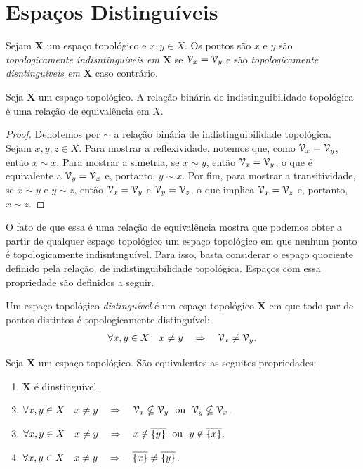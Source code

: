 \section{Espaços Distinguíveis}

\begin{defi}
	Sejam $\bm X$ um espaço topológico e $x,y \in X$. Os pontos são $x$ e $y$ são \emph{topologicamente indisntinguíveis em $\bm X$} se $\mathcal{V}_x = \mathcal{V}_y$ e são \emph{topologicamente disntinguíveis em $\bm X$} caso contrário.
\end{defi}

\begin{prop}
	Seja $\bm X$ um espaço topológico. A relação binária de indistinguibilidade topológica é uma relação de equivalência em $X$.
\end{prop}
\begin{proof}
	Denotemos por $\sim$ a relação binária de indistinguibilidade topológica. Sejam $x,y,z \in X$. Para mostrar a reflexividade, notemos que, como $\mathcal{V}_x=\mathcal{V}_y$, então $x \sim x$. Para mostrar a simetria, se $x \sim y$, então $\mathcal{V}_x=\mathcal{V}_y$, o que é equivalente a $\mathcal{V}_y=\mathcal{V}_x$ e, portanto, $y \sim x$. Por fim, para mostrar a transitividade, se $x \sim y$ e $y \sim z$, então $\mathcal{V}_x=\mathcal{V}_y$ e $\mathcal{V}_y=\mathcal{V}_z$, o que implica $\mathcal{V}_x=\mathcal{V}_z$ e, portanto, $x \sim z$.
\end{proof}

O fato de que essa é uma relação de equivalência mostra que podemos obter a partir de qualquer espaço topológico um espaço topológico em que nenhum ponto é topologicamente indisntinguível. Para isso, basta considerar o espaço quociente definido pela relação. de indistinguibilidade topológica. Espaços com essa propriedade são definidos a seguir.

\begin{defi}[$T_0$]
	Um espaço topológico \emph{distinguível} é um espaço topológico $\bm X$ em que todo par de pontos distintos é topologicamente distinguível:
	\begin{equation*}
	\forall x,y \in X \quad x \neq y \quad \Rightarrow \quad \mathcal{V}_x \neq \mathcal{V}_y.
	\end{equation*}
\end{defi}

\begin{prop}
	Seja $\bm X$ um espaço topológico. São equivalentes as seguites propriedades:
	\begin{enumerate}
	\item $\bm X$ é dinstinguível.
	\item $\forall x,y \in X \quad x \neq y \quad \Rightarrow \quad \mathcal{V}_x \nsubseteq \mathcal{V}_y \text{\ \ ou\ \ } \mathcal{V}_y \nsubseteq \mathcal{V}_x$.
	\item $\forall x,y \in X \quad x \neq y \quad \Rightarrow \quad x \notin \overline{\{y\}} \text{\ \ ou\ \ } y \notin \overline{\{x\}}$.
	\item $\forall x,y \in X \quad x \neq y \quad \Rightarrow \quad \overline{\{x\}} \neq \overline{\{y\}}$.	
\end{enumerate}
\end{prop}

